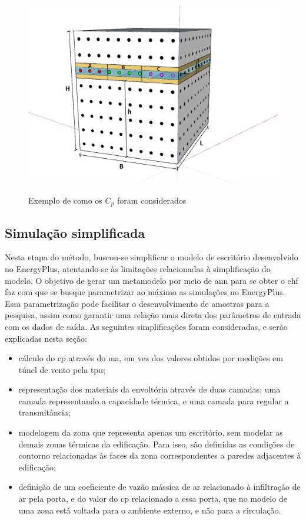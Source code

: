 \begin{figure}[h]
	\centering
	\caption{Exemplo de como os $C_p$ foram considerados}
	\includegraphics[width=.8\linewidth]{img/ex_TPU_h.png}
	\label{fig:tpuwindows}
\end{figure}


\subsection{Simulação simplificada}

Nesta etapa do método, buscou-se simplificar o modelo de escritório desenvolvido no EnergyPlus, atentando-se às limitações relacionadas à simplificação do modelo.
O objetivo de gerar um metamodelo por meio de \acrfull{ann} para se obter o \acrshort{ehf} faz com que se busque parametrizar ao máximo as simulações no EnergyPlus.
Essa parametrização pode facilitar o desenvolvimento de amostras para a pesquisa, assim como garantir uma relação mais direta dos parâmetros de entrada com os dados de saída. 
As seguintes simplificações foram consideradas, e serão explicadas nesta seção:

\begin{itemize}
	\item cálculo do \acrshort{cp} através do \acrlong{ma}, em vez dos valores obtidos por medições em túnel de vento pela \acrshort{tpu};
	\item representação dos materiais da envoltória através de duas camadas: uma camada representando a capacidade térmica, e uma camada para regular a transmitância;  %
	\item modelagem da zona que representa apenas um escritório, sem modelar as demais zonas térmicas da edificação. Para isso, são definidas as condições de contorno relacionadas às faces da zona correspondentes a paredes adjacentes à edificação;
	\item definição de um coeficiente de vazão mássica de ar relacionado à infiltração de ar pela porta, e do valor do \acrshort{cp} relacionado a essa porta, que no modelo de uma zona está voltada para o ambiente externo, e não para a circulação.
\end{itemize}

